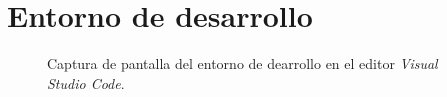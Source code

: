 \section{Entorno de desarrollo}

\begin{figure}[htbp]
	\centerline{}
	\caption*{Captura de pantalla del entorno de dearrollo en el editor \textit{Visual Studio Code}.}
	\label{figure:entorno}
\end{figure}







